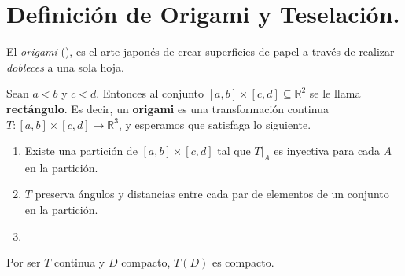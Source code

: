 \documentclass{beamer}
\begin{document}

\begin{frame}[plain]
	
\end{frame}

\section{Definición de Origami y Teselación.} %
\begin{frame}[t]
	\begin{exampleblock}{}
		El \textit{origami} (), es el arte japonés de crear superficies de papel a través de realizar \textit{dobleces} a una sola hoja. \\[2mm]
	\end{exampleblock}
\end{frame}

\begin{frame}[t]
	\begin{exampleblock}{}
		Sean \(a < b \) y \(c < d \). Entonces al conjunto \([a,b] \times [c,d] \subseteq \mathbb{R} ^2\) se le llama \textbf{rectángulo}.
		Es decir, un \textbf{origami} es una transformación continua \(T: [a,b] \times [c,d] \longrightarrow \mathbb{R} ^3\), y esperamos que satisfaga lo siguiente.
		\begin{enumerate}
			\item Existe una partición de \([a,b] \times [c,d]\) tal que \(T \big| _{A}\) es inyectiva para cada \(A\) en la partición.
			\item \(T\) preserva ángulos y distancias entre cada par de elementos de un conjunto en la partición.
			\item 
		\end{enumerate}
		Por ser \(T\) continua y \(D\) compacto, \(T(D)\) es compacto.
	\end{exampleblock}
\end{frame}


\end{document}
